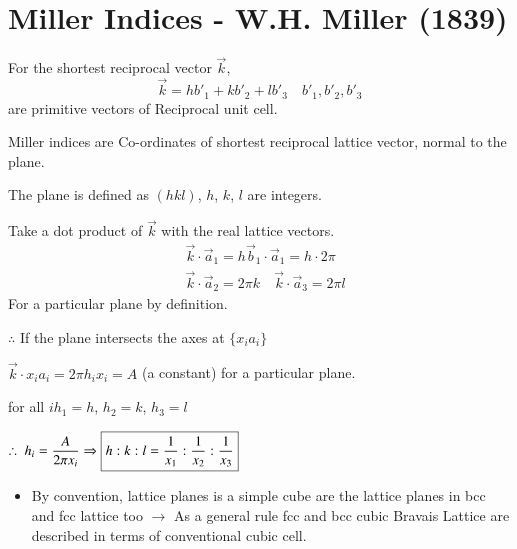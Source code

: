 \section*{Miller Indices - W.H. Miller (1839)}

For the shortest reciprocal vector $\overrightarrow{k}$,
$$
\overrightarrow{k}=hb'_{1}+kb'_{2}+lb'_{3}\quad b'_{1},b'_{2},b'_{3}
$$
are primitive vectors of Reciprocal unit cell.

Miller indices are Co-ordinates of shortest reciprocal lattice vector, normal to the plane.

The plane is defined as $(hkl)$, $h$, $k$, $l$ are integers.

Take a dot product of $\overrightarrow{k}$ with the real lattice vectors.
\begin{align*}
& \overrightarrow{k}\cdot \overrightarrow{a}_{1}=h\overrightarrow{b}_{1}\cdot \overrightarrow{a}_{1}=h\cdot 2\pi\\
& \overrightarrow{k}\cdot \overrightarrow{a}_{2}=2\pi k\quad \overrightarrow{k}\cdot \overrightarrow{a}_{3}=2\pi l
\end{align*}
For a particular plane  by definition.

$\therefore$ If the plane intersects the axes at $\{x_{i}a_{i}\}$

$\overrightarrow{k}\cdot x_{i}a_{i}=2\pi h_{i}x_{i}=A$ (a constant) for a particular plane.

for all $i$\qquad $h_{1}=h$, $h_{2}=k$, $h_{3}=l$

$\therefore \ h_{i}=\dfrac{A}{2\pi x_{i}}\Rightarrow \fbox{$h:k:l=\dfrac{1}{x_{1}}: \dfrac{1}{x_{2}} : \dfrac{1}{x_{3}}$}$ 
\begin{itemize}
\item By convention, lattice planes is a simple cube are the lattice planes in bcc and fcc lattice too $\to$ As a general rule fcc and bcc cubic Bravais Lattice are described in terms of conventional cubic cell.
\end{itemize}


